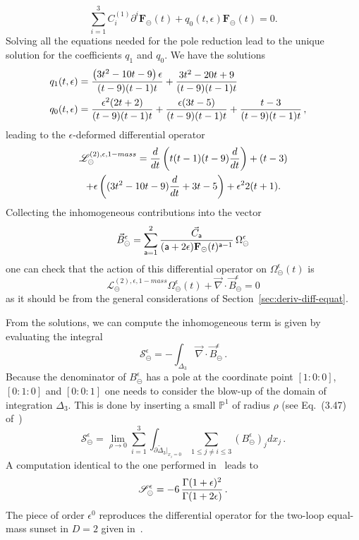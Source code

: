 \documentclass[a4paper,12pt]{article}
\numberwithin{equation}{section}
\numberwithin{figure}{section}
\def\su{\circleddash}
\begin{document}
\begin{equation}\label{e:c0}
  \sum_{i=1}^3C_i^{(1)}\partial^i \textbf{F}_\su(t)+ q_0(t,\epsilon) \textbf{F}_\su (t) =0.
\end{equation}
%
Solving all the equations needed for the pole reduction lead
to the unique solution for the coefficients $q_1$ and $q_0$. 
We have the solutions
\begin{align}
  q_1(t,\epsilon)&=\frac{\left(3 t^2-10 t-9\right) \epsilon }{(t-9) (t-1) t}+\frac{3 t^2-20 t+9}{(t-9) (t-1)
   t}\cr
  q_0(t,\epsilon)&=\frac{\epsilon ^2 (2 t+2)}{(t-9) (t-1) t}+\frac{\epsilon  (3 t-5)}{(t-9) (t-1)
   t}+\frac{t-3}{(t-9) (t-1) t} \, ,
\end{align}
leading to the $\epsilon$-deformed differential operator
\begin{multline}
  \label{e:PF2sunset1massepsilon}
     \mathscr{L}^{(2),\epsilon,1-mass}_\su ={d\over dt}\left( t(t-1)(t-9)
       {d\over dt}\right)+(t-3)\cr+\epsilon\left((3t^2-10t-9) {d\over
         dt}+3t-5\right)
     +\epsilon^2 2(t+1).
\end{multline}
%
Collecting the inhomogeneous contributions into the vector
\begin{equation}
  \vec B_\su^\epsilon=\sum_{\mathsf{a}=1}^2 {\vec C_{\mathsf{a}}\over
    (\mathsf{a}+2\epsilon)\textbf{F}_\su(t)^{\mathsf{a}-1}}\, \Omega_\su^\epsilon
\end{equation}
one can check that the action of this differential operator on
$\Omega_{\su}^\epsilon(t)$ is
\begin{equation}
      \mathscr{L}^{(2),\epsilon,1-mass}_\su
      \Omega_{\su}^\epsilon(t)+\vec\nabla \cdot\vec B_\su^\epsilon=0
    \end{equation}
as it should be from the general considerations of Section~\ref{sec:deriv-diff-equat}.


\medskip
From the solutions, we can compute the  inhomogeneous term is given by evaluating the integral 
\begin{equation}
  \mathscr{S}_\su^\epsilon
  =-\int_{\Delta_3} \vec\nabla\cdot\vec B^\epsilon_\su \,.
\end{equation}
%
Because the denominator of $ B^\epsilon_\su$ has a pole at the coordinate
point $[1:0:0]$, $[0:1:0]$ and $[0:0:1]$ one needs to consider the
blow-up  of the domain of integration $\Delta_3$. This is done by inserting a small
$\mathbb P^1$ of radius $\rho$ (see Eq.~(3.47) of~\cite{Bloch:2016izu})
\begin{equation}
    \mathscr{S}_\su^\epsilon=\lim_{\rho\to0} \sum_{i=1}^3
    \int_{\partial\tilde\Delta_3|_{x_i=0}} \sum_{1\leq j\neq i\leq 3}
    (B^\epsilon_\su)_j dx_j \, .
\end{equation}
A computation identical to the one performed in~\cite{Bloch:2016izu} leads to
\begin{equation}
 \mathscr{S}_\su^\epsilon=  -6 \, {\Gamma(1+\epsilon)^2\over \Gamma(1+2\epsilon)} \, . 
\end{equation}
The piece of order $\epsilon^0$ reproduces the differential operator
for the two-loop equal-mass sunset in $D=2$ given
in~\cite{Bloch:2013tra,Bloch:2013tra,Vanhove:2014wqa,Bonisch:2020qmm,Pogel:2022vat}.
\end{document}
